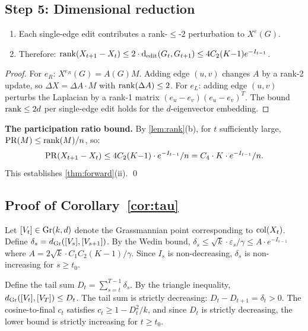 \documentclass{../shared/primo}
\begin{document}
\subsection{Step 5: Dimensional reduction}

\begin{lemma}\label{lem:rank}
\leavevmode
\begin{enumerate}
\item[\textup{(a)}] Each single-edge edit contributes a rank-$\leq$-$2$ perturbation to $X^e(G)$.
\item[\textup{(b)}] Therefore: $\operatorname{rank}(X_{t+1} - X_t) \leq 2 \cdot \operatorname{d_{edit}}(G_t, G_{t+1}) \leq 4C_2(K{-}1) e^{-I_{t-1}}$.
\end{enumerate}
\end{lemma}

\begin{proof}
For $e_R$: $X^{e_R}(G) = A(G)M$. Adding edge $(u,v)$ changes $A$ by a rank-2 update, so $\Delta X = \Delta A \cdot M$ with $\operatorname{rank}(\Delta A) \leq 2$. For $e_L$: adding edge $(u,v)$ perturbs the Laplacian by a rank-1 matrix $(e_u - e_v)(e_u - e_v)^T$. The bound $\operatorname{rank} \leq 2d$ per single-edge edit holds for the $d$-eigenvector embedding.
\end{proof}

\textbf{The participation ratio bound.} By \cref{lem:rank}(b), for $t$ sufficiently large, $\operatorname{PR}(M) \leq \operatorname{rank}(M)/n$, so:
\[
\operatorname{PR}(X_{t+1} - X_t) \leq 4C_2(K{-}1) \cdot e^{-I_{t-1}} / n = C_4 \cdot K \cdot e^{-I_{t-1}} / n.
\]
This establishes \cref{thm:forward}(ii). \qed

\subsection{Proof of Corollary~\ref{cor:tau}}

Let $[V_t] \in \operatorname{Gr}(k, d)$ denote the Grassmannian point corresponding to $\operatorname{col}(X_t)$. Define $\delta_s = d_{\mathrm{Gr}}([V_s], [V_{s+1}])$. By the Wedin bound, $\delta_s \leq \sqrt{k} \cdot \varepsilon_s / \gamma \leq A \cdot e^{-I_{s-1}}$ where $A = 2\sqrt{k} \cdot C_1 C_2 (K{-}1)/\gamma$. Since $I_s$ is non-decreasing, $\delta_s$ is non-increasing for $s \geq t_0$.

Define the tail sum $D_t = \sum_{s=t}^{T-1} \delta_s$. By the triangle inequality, $d_{\mathrm{Gr}}([V_t], [V_T]) \leq D_t$. The tail sum is strictly decreasing: $D_t - D_{t+1} = \delta_t > 0$. The cosine-to-final $c_t$ satisfies $c_t \geq 1 - D_t^2/k$, and since $D_t$ is strictly decreasing, the lower bound is strictly increasing for $t \geq t_0$.
\end{document}
